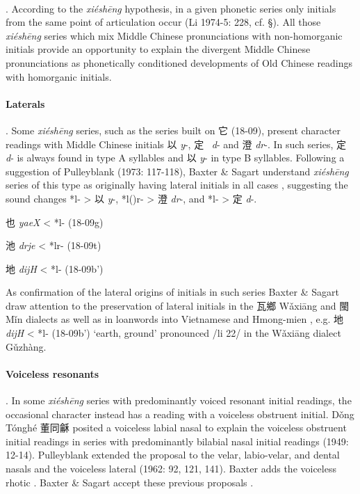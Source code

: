 \paragraph{}. According to the \emph{xiéshēng}
hypothesis, in a given phonetic series only initials from the same point
of articulation occur (Li 1974-5: 228,
\cite[11]{Schuessler2009minimal}
cf. §). All
those  \emph{xiéshēng} series which mix Middle Chinese pronunciations
with non-homorganic initials provide an opportunity to explain the
divergent Middle Chinese pronunciations as phonetically conditioned
developments of Old Chinese readings with homorganic initials.

\paragraph{Laterals}. Some \emph{xiéshēng}
series, such as the series built on 它 (18-09), present character
readings with Middle Chinese initials 以  \emph{y}-, 定~ \emph{d}- and 澄
 \emph{dr}-. In such series, 定  \emph{d}- is always found in type A
syllables and 以 \emph{y}- in type B syllables. Following a suggestion
of Pulleyblank (1973: 117-118), Baxter \& Sagart understand
 \emph{xiéshēng} series of this type as originally having lateral
initials in all cases 
\citep[109]{Baxter2014OldChinese}, suggesting the sound changes *l-
\textgreater{} 以  \emph{y}-, *l({})r- \textgreater{} 澄  \emph{dr}-, and
*l{}- \textgreater{} 定  \emph{d}-.

\begin{description} \item
也  \emph{yaeX} \textless{} *l- (18-09g)

\item
池  \emph{drje} \textless{} *lr- (18-09t)

\item
地  \emph{dijH} \textless{} *l{}- (18-09b')
\end{description}

As confirmation of the lateral origins of initials in such series Baxter
\& Sagart draw attention to the preservation of lateral initials in the
瓦鄉 Wǎxiāng and 閩 Mǐn dialects as well as in loanwords into Vietnamese
and Hmong-mien 
\citeyearpar[109-110]{Baxter2014OldChinese}, e.g. 地  \emph{dijH} \textless{} *l{}-
(18-09b') `earth, ground' pronounced /li 22/ in the Wǎxiāng dialect
Gǔzhàng.

\paragraph{Voiceless resonants}. In some
 \emph{xiéshēng} series with predominantly voiced resonant initial
readings, the occasional character instead has a reading with a
voiceless obstruent initial. Dǒng Tónghé 董同龢 posited a voiceless
labial nasal to explain the voiceless obstruent initial readings in
series with predominantly bilabial nasal initial readings (1949: 12-14).
Pulleyblank extended the proposal to the velar, labio-velar, and dental
nasals and the voiceless lateral (1962: 92, 121, 141). Baxter adds the
voiceless rhotic 
\citep[201-202]{Baxter1992}. Baxter \& Sagart accept these previous
proposals 
\citeyearpar[111-116]{Baxter2014OldChinese}.

